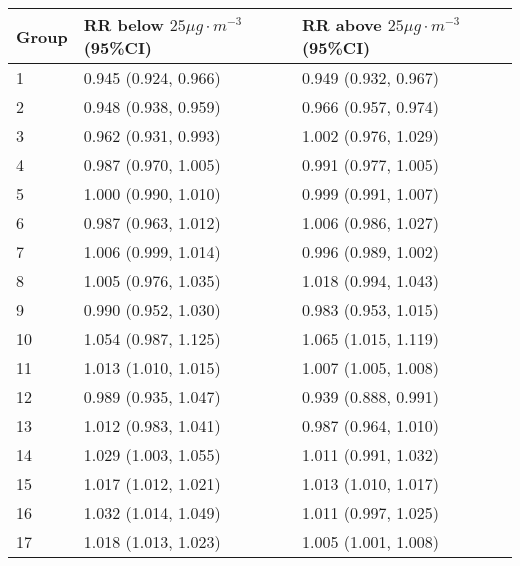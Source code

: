 \begin{tabular}{lll}
  \hline
Group & RR below $25 \mu g \cdot m^{-3}$ (95\%CI) & RR above $25 \mu g \cdot m^{-3}$ (95\%CI) \\ 
  \hline
   1 & 0.945 (0.924, 0.966) & 0.949 (0.932, 0.967) \\ 
     2 & 0.948 (0.938, 0.959) & 0.966 (0.957, 0.974) \\ 
     3 & 0.962 (0.931, 0.993) & 1.002 (0.976, 1.029) \\ 
     4 & 0.987 (0.970, 1.005) & 0.991 (0.977, 1.005) \\ 
     5 & 1.000 (0.990, 1.010) & 0.999 (0.991, 1.007) \\ 
     6 & 0.987 (0.963, 1.012) & 1.006 (0.986, 1.027) \\ 
     7 & 1.006 (0.999, 1.014) & 0.996 (0.989, 1.002) \\ 
     8 & 1.005 (0.976, 1.035) & 1.018 (0.994, 1.043) \\ 
     9 & 0.990 (0.952, 1.030) & 0.983 (0.953, 1.015) \\ 
    10 & 1.054 (0.987, 1.125) & 1.065 (1.015, 1.119) \\ 
    11 & 1.013 (1.010, 1.015) & 1.007 (1.005, 1.008) \\ 
    12 & 0.989 (0.935, 1.047) & 0.939 (0.888, 0.991) \\ 
    13 & 1.012 (0.983, 1.041) & 0.987 (0.964, 1.010) \\ 
    14 & 1.029 (1.003, 1.055) & 1.011 (0.991, 1.032) \\ 
    15 & 1.017 (1.012, 1.021) & 1.013 (1.010, 1.017) \\ 
    16 & 1.032 (1.014, 1.049) & 1.011 (0.997, 1.025) \\ 
    17 & 1.018 (1.013, 1.023) & 1.005 (1.001, 1.008) \\ 
   \hline
\end{tabular}

